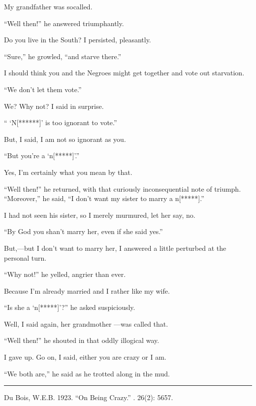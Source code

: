 \documentclass[letterpaper,10pt,english]{jupyterBook}
\begin{document}
\sphinxAtStartPar
My grandfather was so\sphinxhyphen{}called.

\sphinxAtStartPar
“Well then!” he answered triumphantly.

\sphinxAtStartPar
Do you live in the South? I persisted, pleasantly.

\sphinxAtStartPar
“Sure,” he growled, “and starve there.”

\sphinxAtStartPar
I should think you and the Negroes might get together and vote out starvation.

\sphinxAtStartPar
“We don’t let them vote.”

\sphinxAtStartPar
We? Why not? I said in surprise.

\sphinxAtStartPar
“ `N{[}******{]}’ is too ignorant to vote.”

\sphinxAtStartPar
But, I said, I am not so ignorant as you.

\sphinxAtStartPar
“But you’re a ‘n{[}*****{]}’.”

\sphinxAtStartPar
Yes, I’m certainly what you mean by that.

\sphinxAtStartPar
“Well then!” he returned, with that curiously inconsequential note of triumph. “Moreover,” he said, “I don’t want my sister to marry a n{[}*****{]}.”

\sphinxAtStartPar
I had not seen his sister, so I merely murmured, let her say, no.

\sphinxAtStartPar
“By God you shan’t marry her, even if she said yes.”

\sphinxAtStartPar
But,—but I don’t want to marry her, I answered a little perturbed at the personal turn.

\sphinxAtStartPar
“Why not!” he yelled, angrier than ever.

\sphinxAtStartPar
Because I’m already married and I rather like my wife.

\sphinxAtStartPar
“Is she a ‘n{[}*****{]}’?” he asked suspiciously.

\sphinxAtStartPar
Well, I said again, her grandmother —was called that.

\sphinxAtStartPar
“Well then!” he shouted in that oddly illogical way.

\sphinxAtStartPar
I gave up. Go on, I said, either you are crazy or I am.

\sphinxAtStartPar
“We both are,” he said as he trotted along in the mud.


\bigskip\hrule\bigskip


\sphinxAtStartPar
{} Du Bois, W.E.B. 1923. “On Being Crazy.” . 26(2): 56\sphinxhyphen{}57.
\end{document}
